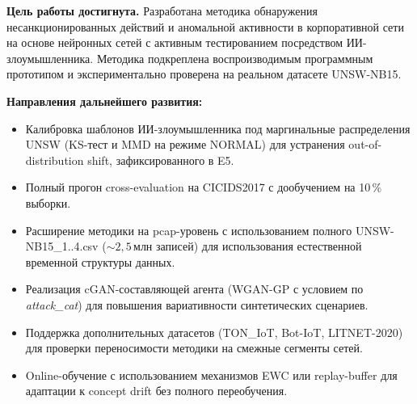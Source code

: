 \textbf{Цель работы достигнута.} Разработана методика обнаружения
несанкционированных действий и аномальной активности в корпоративной
сети на основе нейронных сетей с активным тестированием посредством
ИИ-злоумышленника. Методика подкреплена воспроизводимым программным
прототипом и экспериментально проверена на реальном датасете
UNSW-NB15.

\textbf{Направления дальнейшего развития:}
\begin{itemize}
    \item Калибровка шаблонов ИИ-злоумышленника под маргинальные
    распределения UNSW (KS-тест и MMD на режиме NORMAL) для
    устранения out-of-distribution shift, зафиксированного в E5.
    \item Полный прогон cross-evaluation на CICIDS2017 с дообучением
    на 10\,\% выборки.
    \item Расширение методики на pcap-уровень с использованием полного
    UNSW-NB15\_1..4.csv ($\sim 2{,}5\,\text{млн}$ записей) для
    использования естественной временной структуры данных.
    \item Реализация cGAN-составляющей агента (WGAN-GP с условием по
    \emph{attack\_cat}) для повышения вариативности синтетических
    сценариев.
    \item Поддержка дополнительных датасетов (TON\_IoT, Bot-IoT,
    LITNET-2020) для проверки переносимости методики на смежные
    сегменты сетей.
    \item Online-обучение с использованием механизмов EWC или
    replay-buffer для адаптации к concept drift без полного
    переобучения.
\end{itemize}
